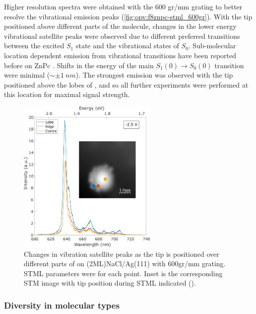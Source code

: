 Higher resolution spectra were obtained with the 600 gr/mm grating to better resolve the vibrational emission peaks (\autoref{fig:opv:f8znpc-stml_600gr}). With the tip positioned above different parts of the molecule, changes in the lower energy vibrational satellite peaks were observed due to different preferred transitions between the excited $S_1$ state and the vibrational states of $S_0$. Sub-molecular location dependent emission from vibrational transitions have been reported before on ZnPc \citep{Zhang2016,Doppagne2017}. Shifts in the energy of the main $S_1(0) \rightarrow S_0(0)$ transition were minimal ($\sim \pm \SI{1}{nm}$). The strongest emission was observed with the tip positioned above the lobes of , and so all further experiments were performed at this location for maximal signal strength.


\begin{figure}[H]
    \centering
        \includegraphics[width=0.6\textwidth]{pictures/f8znpc_-ve_emission_inset600_position.png}
        \caption{Changes in vibration satellite peaks as the tip is positioned over different parts of  on (2ML)NaCl/Ag(111) with 600gr/mm grating. STML parameters were  for each point. Inset is the corresponding STM image with tip position during STML indicated ().}
        \label{fig:opv:f8znpc-stml_600gr}
\end{figure}



\subsubsection*{Diversity in molecular types}

